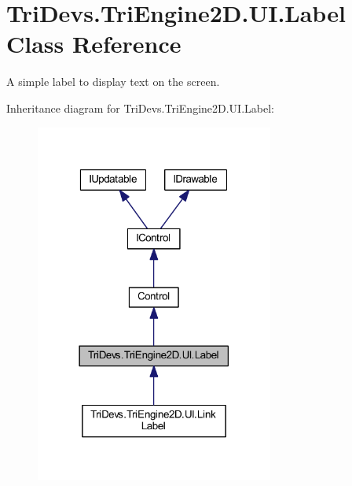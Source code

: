 \hypertarget{class_tri_devs_1_1_tri_engine2_d_1_1_u_i_1_1_label}{\section{Tri\-Devs.\-Tri\-Engine2\-D.\-U\-I.\-Label Class Reference}
\label{class_tri_devs_1_1_tri_engine2_d_1_1_u_i_1_1_label}
}


A simple label to display text on the screen.  




Inheritance diagram for Tri\-Devs.\-Tri\-Engine2\-D.\-U\-I.\-Label\-:\nopagebreak
\begin{figure}[H]
\begin{center}
\leavevmode
\includegraphics[width=222pt]{class_tri_devs_1_1_tri_engine2_d_1_1_u_i_1_1_label__inherit__graph}
\end{center}
\end{figure}


